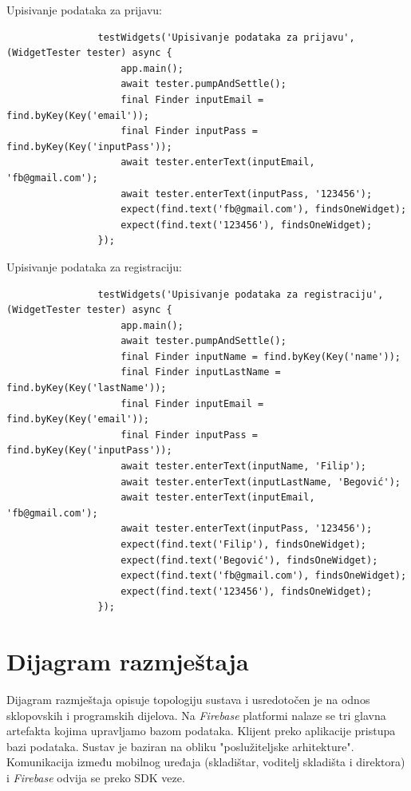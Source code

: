  			Upisivanje podataka za prijavu:
 			\begin{verbatim}
 				testWidgets('Upisivanje podataka za prijavu', (WidgetTester tester) async {
 					app.main();
 					await tester.pumpAndSettle();
 					final Finder inputEmail = find.byKey(Key('email'));
 					final Finder inputPass = find.byKey(Key('inputPass'));
 					await tester.enterText(inputEmail, 'fb@gmail.com');
 					await tester.enterText(inputPass, '123456');
 					expect(find.text('fb@gmail.com'), findsOneWidget);
 					expect(find.text('123456'), findsOneWidget);
 				});
 			\end{verbatim}
 		
 			Upisivanje podataka za registraciju:
 			\begin{verbatim}
 				testWidgets('Upisivanje podataka za registraciju', (WidgetTester tester) async {
 					app.main();
 					await tester.pumpAndSettle();
 					final Finder inputName = find.byKey(Key('name'));
 					final Finder inputLastName = find.byKey(Key('lastName'));
 					final Finder inputEmail = find.byKey(Key('email'));
 					final Finder inputPass = find.byKey(Key('inputPass'));
 					await tester.enterText(inputName, 'Filip');
 					await tester.enterText(inputLastName, 'Begović');
 					await tester.enterText(inputEmail, 'fb@gmail.com');
 					await tester.enterText(inputPass, '123456');
 					expect(find.text('Filip'), findsOneWidget);
 					expect(find.text('Begović'), findsOneWidget);
 					expect(find.text('fb@gmail.com'), findsOneWidget);
 					expect(find.text('123456'), findsOneWidget);
 				});
 			\end{verbatim}
		
		\section{Dijagram razmještaja}
			
			Dijagram razmještaja opisuje topologiju sustava i usredotočen je na odnos sklopovskih i programskih dijelova. Na \textit{Firebase} platformi nalaze se tri glavna artefakta kojima upravljamo bazom podataka. Klijent preko aplikacije pristupa bazi podataka. Sustav je baziran na obliku "poslužiteljske arhitekture". Komunikacija između mobilnog uređaja  (skladištar, voditelj skladišta i direktora) i \textit{Firebase} odvija se preko SDK veze.
			

